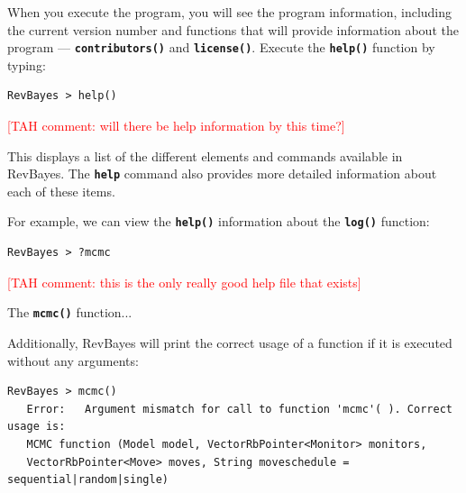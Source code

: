 \documentclass[11pt]{article}
\newcommand{\taha}[1]{{\textcolor{red}{[TAH comment: #1]}}} %
\newcommand{\cl}[1]{{\texttt{\textbf{#1}}}}
\newcommand{\mbcl}[1]{\exs{\cl{MrBayes > {#1}}}}
\begin{document}
When you execute the program, you will see the program information, including the current version number and functions that will provide information about the program --- \cl{contributors()} and \cl{license()}.%
Execute the \cl{help()} function by typing:

{\tt \begin{snugshade*}
\begin{lstlisting}
RevBayes > help()
\end{lstlisting}
\end{snugshade*}}
\taha{will there be help information by this time?}

This displays a list of the different elements and commands available in RevBayes. The \cl{help} command also provides more detailed information about each of these items.

For example, we can view the \cl{help()} information about the \cl{log()} function:

{\tt \begin{snugshade*}
\begin{lstlisting}
RevBayes > ?mcmc
\end{lstlisting}
\end{snugshade*}}

\taha{this is the only really good help file that exists}

The \cl{mcmc()} function...

Additionally, RevBayes will print the correct usage of a function if it is executed without any arguments:
{\tt \small \begin{snugshade*}
\begin{lstlisting}
RevBayes > mcmc()
   Error:   Argument mismatch for call to function 'mcmc'( ). Correct usage is:
   MCMC function (Model model, VectorRbPointer<Monitor> monitors,
   VectorRbPointer<Move> moves, String moveschedule = sequential|random|single)
\end{lstlisting}
\end{snugshade*}}

%
\end{document}
